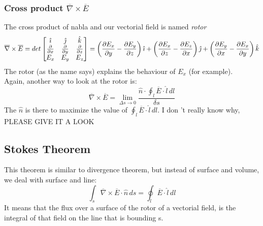 \subsubsection*{Cross product $\overline{\nabla} \times \overline{E}$}
The cross product of nabla and our vectorial field is named \emph{rotor}
\begin{equation}
\overline{\nabla}\times \overline{E}=det
\left[ \begin{matrix}
\hat{\imath} & \hat{\jmath} & \hat{\mathnormal{k}}\\
\frac{\partial}{\partial x} & \frac{\partial}{\partial y} & \frac{\partial}{\partial z}\\
E_x & E_y & E_z
\end{matrix} \right]=
\left(\frac{\partial E_x}{\partial y} - \frac{\partial E_y}{\partial z}\right)\hat{\imath}+
\left(\frac{\partial E_x}{\partial z} - \frac{\partial E_z}{\partial x}\right)\hat{\jmath}+
\left(\frac{\partial E_y}{\partial x} - \frac{\partial E_x}{\partial y}\right)\hat{\mathnormal{k}}
\end{equation}
The rotor (as the name says) explains the behaviour of $E_x$ (for example).\\
Again, another way to look at the rotor is:
\begin{equation}
\overline{\nabla} \times \overline{E}=\lim_{\Delta s \rightarrow 0}\frac{\hat{n}\cdot\oint_l \overline{E}\cdot \hat{l}\,dl}{\delta s}
\end{equation}
The $\hat{n}$ is there to maximize the value of $\oint_l \overline{E}\cdot \hat{l}\,dl$. I don
't really know why, PLEASE GIVE IT A LOOK
\subsection*{Stokes Theorem}
This theorem is similar to divergence theorem, but instead of surface and volume, we deal with surface and line:
\begin{equation}\label{eq:stokes_eq}
\int_s \overline{\nabla}\times \overline{E}\cdot \hat{n}\,ds=\oint_l\overline{E}\cdot\hat{l}\,dl
\end{equation}
It means that the flux over a surface of the rotor of a vectorial field, is the integral of that field on the line that is bounding s.

